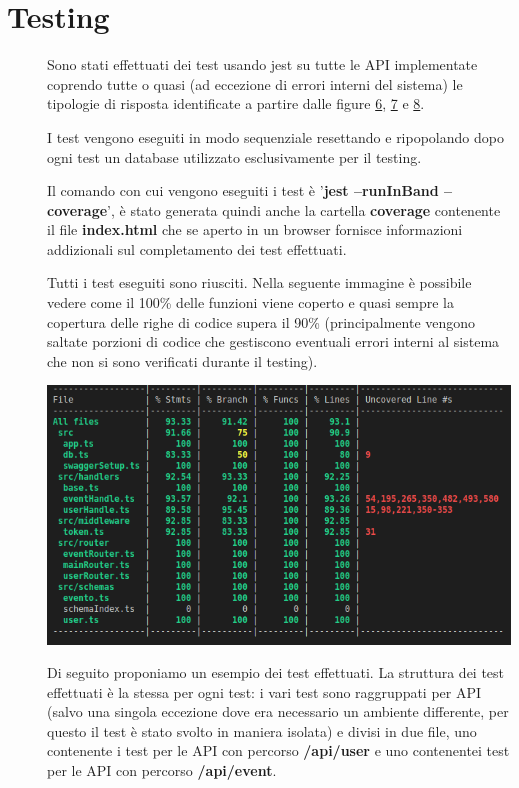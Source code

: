 \documentclass{article}
\begin{document}
\section{Testing}
\begin{description}
    \item[] Sono stati effettuati dei test usando jest su tutte le API implementate coprendo tutte o quasi (ad eccezione di errori interni del sistema) le tipologie di risposta identificate a partire dalle figure \hyperref[img:6]{6}, \hyperref[img:7]{7} e \hyperref[img:8]{8}.
    \item[] I test vengono eseguiti in modo sequenziale resettando e ripopolando dopo ogni test un database utilizzato esclusivamente per il testing.
    \item[] Il comando con cui vengono eseguiti i test è '\textbf{jest --runInBand --coverage}', è stato generata quindi anche la cartella \textbf{coverage} contenente il file \textbf{index.html} che se aperto in un browser fornisce informazioni addizionali sul completamento dei test effettuati.
    \item[] Tutti i test eseguiti sono riusciti. Nella seguente immagine è possibile vedere come il 100\% delle funzioni viene coperto e quasi sempre la copertura delle righe di codice supera il 90\% (principalmente vengono saltate porzioni di codice che gestiscono eventuali errori interni al sistema che non si sono verificati durante il testing).
    \item[] \begin{center}
            \includegraphics[scale=0.5]{testOut.png}
        \end{center}
        \clearpage
    \item[] Di seguito proponiamo un esempio dei test effettuati. La struttura dei test effettuati è la stessa per ogni test: i vari test sono raggruppati per API (salvo una singola eccezione dove era necessario un ambiente differente, per questo il test è stato svolto in maniera isolata) e divisi in due file, uno contenente i test per le API con percorso \textbf{/api/user} e uno contenentei test per le API con percorso \textbf{/api/event}.

\end{description}
\end{document}
